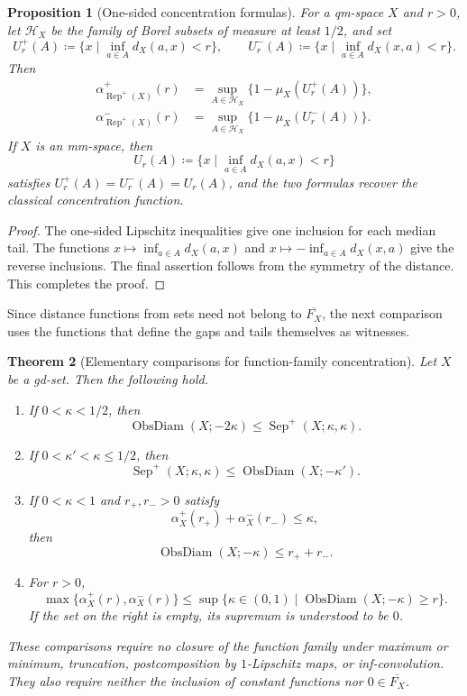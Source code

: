 \documentclass{amsart}
\theoremstyle{plain}
\newtheorem{theorem}{Theorem}[section]
\newtheorem{proposition}[theorem]{Proposition}
\theoremstyle{definition}
\theoremstyle{remark}
\DeclareMathOperator{\od}{ObsDiam}
\begin{document}
\begin{proposition}[One-sided concentration formulas]
\label{prop:directional-invariant-asymmetric-specialization}
For a qm-space $X$ and $r>0$, let $\mathcal H_X$ be the family of Borel
subsets of measure at least $1/2$, and set
\[
U_r^+(A)\coloneqq\{x\mid\inf_{a\in A}d_X(a,x)<r\},\qquad
U_r^-(A)\coloneqq\{x\mid\inf_{a\in A}d_X(x,a)<r\}.
\]
Then
\begin{align*}
\alpha_{\operatorname{Rep}^{+}(X)}^+(r)
&=\sup_{A\in\mathcal H_X}\{1-\mu_X(U_r^+(A))\},\\
\alpha_{\operatorname{Rep}^{+}(X)}^-(r)
&=\sup_{A\in\mathcal H_X}\{1-\mu_X(U_r^-(A))\}.
\end{align*}
If $X$ is an mm-space, then
\[
U_r(A)\coloneqq\{x\mid\inf_{a\in A}d_X(a,x)<r\}
\]
satisfies $U_r^+(A)=U_r^-(A)=U_r(A)$, and the two formulas recover the
classical concentration function.
\end{proposition}

\begin{proof}
The one-sided Lipschitz inequalities give one inclusion for each median
tail.  The functions
$x\mapsto\inf_{a\in A}d_X(a,x)$ and
$x\mapsto-\inf_{a\in A}d_X(x,a)$ give the reverse inclusions.  The final
assertion follows from the symmetry of the distance.  This completes the
proof.
\end{proof}

Since distance functions from sets need not belong to $\overline{F_X}$, the
next comparison uses the functions that define the gaps and tails themselves
as witnesses.

\begin{theorem}[Elementary comparisons for function-family concentration]
\label{thm:elementary-feature-concentration-comparison}
Let $X$ be a gd-set.  Then the following hold.
\begin{enumerate}[label=\textup{(\roman*)}]
\item If $0<\kappa<1/2$, then
\[
\od(X;-2\kappa)\leq\operatorname{Sep}^+(X;\kappa,\kappa).
\]
\item If $0<\kappa'<\kappa\leq1/2$, then
\[
\operatorname{Sep}^+(X;\kappa,\kappa)\leq\od(X;-\kappa').
\]
\item If $0<\kappa<1$ and $r_+,r_->0$ satisfy
\[
\alpha_X^+(r_+)+\alpha_X^-(r_-)\leq\kappa,
\]
then
\[
\od(X;-\kappa)\leq r_++r_-.
\]
\item For $r>0$,
\[
\max\{\alpha_X^+(r),\alpha_X^-(r)\}
\leq\sup\{\kappa\in(0,1)\mid\od(X;-\kappa)\geq r\}.
\]
If the set on the right is empty, its supremum is understood to be $0$.
\end{enumerate}
These comparisons require no closure of the function family under maximum or
minimum, truncation, postcomposition by $1$-Lipschitz maps, or
inf-convolution.  They also require neither the inclusion of constant
functions nor $0\in\overline{F_X}$.
\end{theorem}
\end{document}
